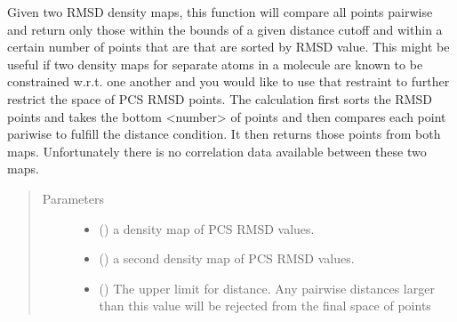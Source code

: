 \documentclass[a4paper,10pt,english,openany,oneside]{sphinxmanual}
\begin{document}
\begin{fulllineitems}
\label{\detokenize{reference/generated/paramagpy.fit.gridsearch_fit_atom_restrain_distance:paramagpy.fit.gridsearch_fit_atom_restrain_distance}}
\sphinxAtStartPar
Given two RMSD density maps, this function will compare
all points pairwise and return only those within the bounds of
a given distance cutoff and within a certain number of points
that are that are sorted by RMSD value.
This might be useful if two density maps for separate atoms
in a molecule are known to be constrained w.r.t. one another
and you would like to use that restraint to further restrict
the space of PCS RMSD points.
The calculation first sorts the RMSD points and takes the bottom
\textless{}number\textgreater{} of points and then compares each point pariwise to
fulfill the distance condition. It then returns those points
from both maps. Unfortunately there is no correlation data
available between these two maps.
\begin{quote}\begin{description}
\item[{Parameters}] \leavevmode\begin{itemize}
\item {} 
\sphinxAtStartPar
{} ({\hyperref[\detokenize{reference/generated/paramagpy.fit.DensityMap:paramagpy.fit.DensityMap}]{}}) \textendash{} a density map of PCS RMSD values.

\item {} 
\sphinxAtStartPar
{} ({\hyperref[\detokenize{reference/generated/paramagpy.fit.DensityMap:paramagpy.fit.DensityMap}]{}}) \textendash{} a second density map of PCS RMSD values.

\item {} 
\sphinxAtStartPar
{} () \textendash{} The upper limit for distance.
Any pairwise distances larger than this value
will be rejected from the final space of points


\end{itemize}
\end{description}
\end{quote}
\end{fulllineitems}
\end{document}
